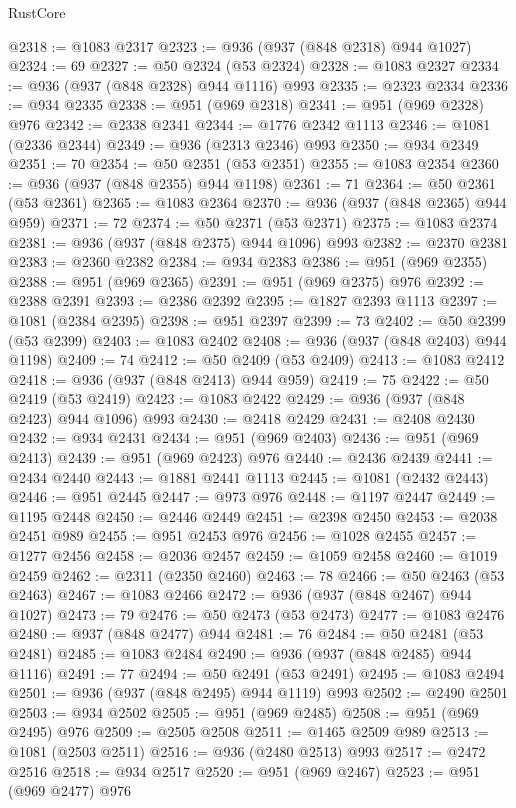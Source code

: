 \begin{lexlean}{RustCore}
\begin{coremodule}
@2318 := @1083 @2317
@2323 := @936 (@937 (@848 @2318) @944 @1027)
@2324 := 69
@2327 := @50 @2324 (@53 @2324)
@2328 := @1083 @2327
@2334 := @936 (@937 (@848 @2328) @944 @1116) @993
@2335 := @2323 @2334
@2336 := @934 @2335
@2338 := @951 (@969 @2318)
@2341 := @951 (@969 @2328) @976
@2342 := @2338 @2341
@2344 := @1776 @2342 @1113
@2346 := @1081 (@2336 @2344)
@2349 := @936 (@2313 @2346) @993
@2350 := @934 @2349
@2351 := 70
@2354 := @50 @2351 (@53 @2351)
@2355 := @1083 @2354
@2360 := @936 (@937 (@848 @2355) @944 @1198)
@2361 := 71
@2364 := @50 @2361 (@53 @2361)
@2365 := @1083 @2364
@2370 := @936 (@937 (@848 @2365) @944 @959)
@2371 := 72
@2374 := @50 @2371 (@53 @2371)
@2375 := @1083 @2374
@2381 := @936 (@937 (@848 @2375) @944 @1096) @993
@2382 := @2370 @2381
@2383 := @2360 @2382
@2384 := @934 @2383
@2386 := @951 (@969 @2355)
@2388 := @951 (@969 @2365)
@2391 := @951 (@969 @2375) @976
@2392 := @2388 @2391
@2393 := @2386 @2392
@2395 := @1827 @2393 @1113
@2397 := @1081 (@2384 @2395)
@2398 := @951 @2397
@2399 := 73
@2402 := @50 @2399 (@53 @2399)
@2403 := @1083 @2402
@2408 := @936 (@937 (@848 @2403) @944 @1198)
@2409 := 74
@2412 := @50 @2409 (@53 @2409)
@2413 := @1083 @2412
@2418 := @936 (@937 (@848 @2413) @944 @959)
@2419 := 75
@2422 := @50 @2419 (@53 @2419)
@2423 := @1083 @2422
@2429 := @936 (@937 (@848 @2423) @944 @1096) @993
@2430 := @2418 @2429
@2431 := @2408 @2430
@2432 := @934 @2431
@2434 := @951 (@969 @2403)
@2436 := @951 (@969 @2413)
@2439 := @951 (@969 @2423) @976
@2440 := @2436 @2439
@2441 := @2434 @2440
@2443 := @1881 @2441 @1113
@2445 := @1081 (@2432 @2443)
@2446 := @951 @2445
@2447 := @973 @976
@2448 := @1197 @2447
@2449 := @1195 @2448
@2450 := @2446 @2449
@2451 := @2398 @2450
@2453 := @2038 @2451 @989
@2455 := @951 @2453 @976
@2456 := @1028 @2455
@2457 := @1277 @2456
@2458 := @2036 @2457
@2459 := @1059 @2458
@2460 := @1019 @2459
@2462 := @2311 (@2350 @2460)
@2463 := 78
@2466 := @50 @2463 (@53 @2463)
@2467 := @1083 @2466
@2472 := @936 (@937 (@848 @2467) @944 @1027)
@2473 := 79
@2476 := @50 @2473 (@53 @2473)
@2477 := @1083 @2476
@2480 := @937 (@848 @2477) @944
@2481 := 76
@2484 := @50 @2481 (@53 @2481)
@2485 := @1083 @2484
@2490 := @936 (@937 (@848 @2485) @944 @1116)
@2491 := 77
@2494 := @50 @2491 (@53 @2491)
@2495 := @1083 @2494
@2501 := @936 (@937 (@848 @2495) @944 @1119) @993
@2502 := @2490 @2501
@2503 := @934 @2502
@2505 := @951 (@969 @2485)
@2508 := @951 (@969 @2495) @976
@2509 := @2505 @2508
@2511 := @1465 @2509 @989
@2513 := @1081 (@2503 @2511)
@2516 := @936 (@2480 @2513) @993
@2517 := @2472 @2516
@2518 := @934 @2517
@2520 := @951 (@969 @2467)
@2523 := @951 (@969 @2477) @976

\end{coremodule}
\end{lexlean}
